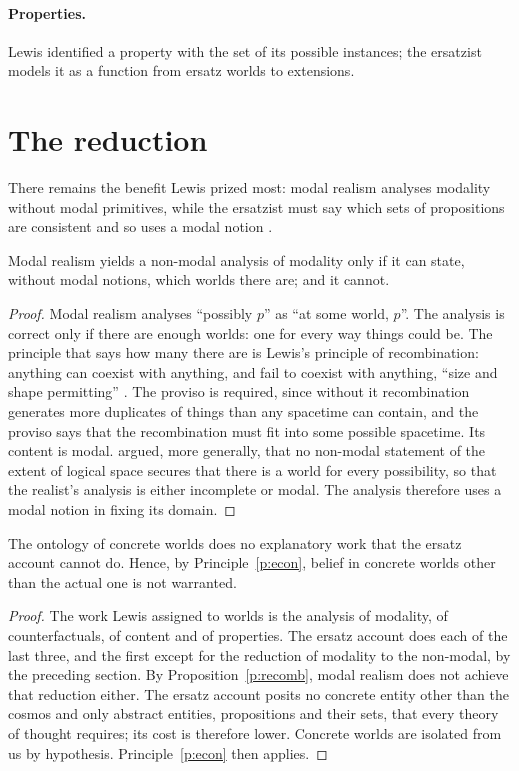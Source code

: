\documentclass{situationist-preprint}
\begin{document}
\paragraph{Properties.} Lewis identified a property with the set of its possible instances; the ersatzist models it as a function from ersatz worlds to extensions.

\section{The reduction}

There remains the benefit Lewis prized most: modal realism analyses modality without modal primitives, while the ersatzist must say which sets of propositions are consistent and so uses a modal notion \citep[\S3.2]{Lewis1986}.

\begin{proposition}\label{p:recomb}
Modal realism yields a non-modal analysis of modality only if it can state, without modal notions, which worlds there are; and it cannot.
\end{proposition}

\begin{proof}
Modal realism analyses \enquote{possibly $p$} as \enquote{at some world, $p$}. The analysis is correct only if there are enough worlds: one for every way things could be. The principle that says how many there are is Lewis's principle of recombination: anything can coexist with anything, and fail to coexist with anything, \enquote{size and shape permitting} \citep[\S1.8]{Lewis1986}. The proviso is required, since without it recombination generates more duplicates of things than any spacetime can contain, and the proviso says that the recombination must fit into some possible spacetime. Its content is modal. \citet{DiversMelia2002} argued, more generally, that no non-modal statement of the extent of logical space secures that there is a world for every possibility, so that the realist's analysis is either incomplete or modal. The analysis therefore uses a modal notion in fixing its domain.
\end{proof}

\begin{theorem}\label{t:main}
The ontology of concrete worlds does no explanatory work that the ersatz account cannot do. Hence, by Principle~\ref{p:econ}, belief in concrete worlds other than the actual one is not warranted.
\end{theorem}

\begin{proof}
The work Lewis assigned to worlds is the analysis of modality, of counterfactuals, of content and of properties. The ersatz account does each of the last three, and the first except for the reduction of modality to the non-modal, by the preceding section. By Proposition~\ref{p:recomb}, modal realism does not achieve that reduction either. The ersatz account posits no concrete entity other than the cosmos and only abstract entities, propositions and their sets, that every theory of thought requires; its cost is therefore lower. Concrete worlds are isolated from us by hypothesis. Principle~\ref{p:econ} then applies.
\end{proof}
\end{document}
